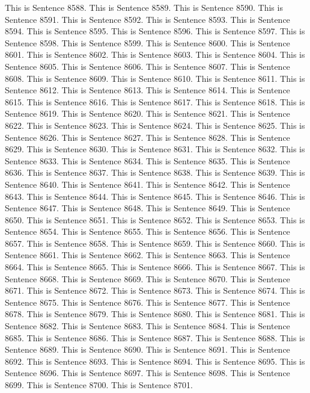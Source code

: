 \documentclass{article}
\begin{document}
This is Sentence 8588.
This is Sentence 8589.
This is Sentence 8590.
This is Sentence 8591.
This is Sentence 8592.
This is Sentence 8593.
This is Sentence 8594.
This is Sentence 8595.
This is Sentence 8596.
This is Sentence 8597.
This is Sentence 8598.
This is Sentence 8599.
This is Sentence 8600.
This is Sentence 8601.
This is Sentence 8602.
This is Sentence 8603.
This is Sentence 8604.
This is Sentence 8605.
This is Sentence 8606.
This is Sentence 8607.
This is Sentence 8608.
This is Sentence 8609.
This is Sentence 8610.
This is Sentence 8611.
This is Sentence 8612.
This is Sentence 8613.
This is Sentence 8614.
This is Sentence 8615.
This is Sentence 8616.
This is Sentence 8617.
This is Sentence 8618.
This is Sentence 8619.
This is Sentence 8620.
This is Sentence 8621.
This is Sentence 8622.
This is Sentence 8623.
This is Sentence 8624.
This is Sentence 8625.
This is Sentence 8626.
This is Sentence 8627.
This is Sentence 8628.
This is Sentence 8629.
This is Sentence 8630.
This is Sentence 8631.
This is Sentence 8632.
This is Sentence 8633.
This is Sentence 8634.
This is Sentence 8635.
This is Sentence 8636.
This is Sentence 8637.
This is Sentence 8638.
This is Sentence 8639.
This is Sentence 8640.
This is Sentence 8641.
This is Sentence 8642.
This is Sentence 8643.
This is Sentence 8644.
This is Sentence 8645.
This is Sentence 8646.
This is Sentence 8647.
This is Sentence 8648.
This is Sentence 8649.
This is Sentence 8650.
This is Sentence 8651.
This is Sentence 8652.
This is Sentence 8653.
This is Sentence 8654.
This is Sentence 8655.
This is Sentence 8656.
This is Sentence 8657.
This is Sentence 8658.
This is Sentence 8659.
This is Sentence 8660.
This is Sentence 8661.
This is Sentence 8662.
This is Sentence 8663.
This is Sentence 8664.
This is Sentence 8665.
This is Sentence 8666.
This is Sentence 8667.
This is Sentence 8668.
This is Sentence 8669.
This is Sentence 8670.
This is Sentence 8671.
This is Sentence 8672.
This is Sentence 8673.
This is Sentence 8674.
This is Sentence 8675.
This is Sentence 8676.
This is Sentence 8677.
This is Sentence 8678.
This is Sentence 8679.
This is Sentence 8680.
This is Sentence 8681.
This is Sentence 8682.
This is Sentence 8683.
This is Sentence 8684.
This is Sentence 8685.
This is Sentence 8686.
This is Sentence 8687.
This is Sentence 8688.
This is Sentence 8689.
This is Sentence 8690.
This is Sentence 8691.
This is Sentence 8692.
This is Sentence 8693.
This is Sentence 8694.
This is Sentence 8695.
This is Sentence 8696.
This is Sentence 8697.
This is Sentence 8698.
This is Sentence 8699.
This is Sentence 8700.
This is Sentence 8701.
\end{document}
